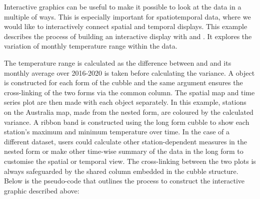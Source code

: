 \documentclass[
]{jss}
\newenvironment{Shaded}{\begin{snugshade}}{\end{snugshade}}
\newcommand{\AttributeTok}[1]{\textcolor[rgb]{0.77,0.63,0.00}{#1}}
\newcommand{\CommentTok}[1]{\textcolor[rgb]{0.56,0.35,0.01}{\textit{#1}}}
\newcommand{\FunctionTok}[1]{\textcolor[rgb]{0.00,0.00,0.00}{#1}}
\newcommand{\NormalTok}[1]{#1}
\newcommand{\OtherTok}[1]{\textcolor[rgb]{0.56,0.35,0.01}{#1}}
\newcommand{\SpecialCharTok}[1]{\textcolor[rgb]{0.00,0.00,0.00}{#1}}
\newcommand{\StringTok}[1]{\textcolor[rgb]{0.31,0.60,0.02}{#1}}
\begin{document}
Interactive graphics can be useful to make it possible to look at the data in a multiple of ways. This is especially important for spatiotemporal data, where we would like to interactively connect spatial and temporal displays. This example describes the process of building an interactive display with  and . It explores the variation of monthly temperature range within the  data.

The temperature range is calculated as the difference between  and  and its monthly average over 2016-2020 is taken before calculating the variance. A  object is constructed for each form of the cubble and the same  argument ensures the cross-linking of the two forms via the common  column. The spatial map and time series plot are then made with each  object separately. In this example, stations on the Australia map, made from the nested form, are coloured by the calculated variance. A ribbon band is constructed using the long form cubble to show each station's maximum and minimum temperature over time. In the case of a different dataset, users could calculate other station-dependent measures in the nested form or make other time-wise summary of the data in the long form to customise the spatial or temporal view. The cross-linking between the two plots is always safeguarded by the shared  column embedded in the cubble structure. Below is the pseudo-code that outlines the process to construct the interactive graphic described above:

\begin{Shaded}
\end{Shaded}
\end{document}
